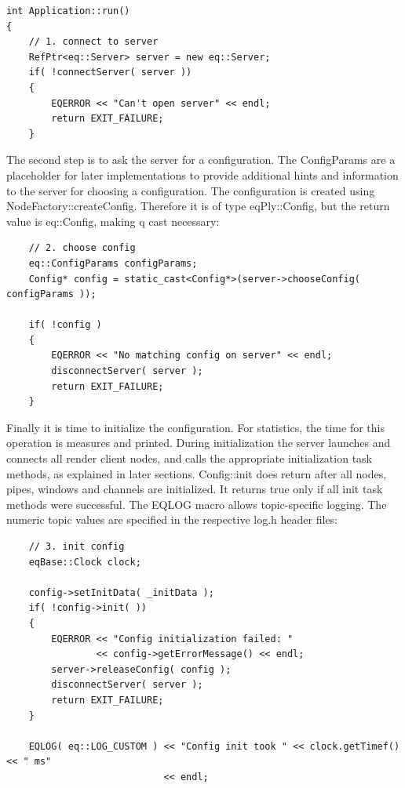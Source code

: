 \documentclass[10pt,a4]{scrartcl}
\begin{document}
{\footnotesize\begin{lstlisting}
int Application::run()
{
    // 1. connect to server
    RefPtr<eq::Server> server = new eq::Server;
    if( !connectServer( server ))
    {
        EQERROR << "Can't open server" << endl;
        return EXIT_FAILURE;
    }
\end{lstlisting}}%

The second step is to ask the server for a configuration. The
\textsf{ConfigParams} are a placeholder for later implementations to
provide additional hints and information to the server for choosing a
configuration. The configuration is created using
\textsf{NodeFactory::createConfig}. Therefore it is of type
\textsf{eqPly::Config}, but the return value is \textsf{eq::Config},
making q cast necessary:

{\footnotesize\begin{lstlisting}
    // 2. choose config
    eq::ConfigParams configParams;
    Config* config = static_cast<Config*>(server->chooseConfig( configParams ));

    if( !config )
    {
        EQERROR << "No matching config on server" << endl;
        disconnectServer( server );
        return EXIT_FAILURE;
    }
\end{lstlisting}}%

Finally it is time to initialize the configuration. For statistics, the
time for this operation is measures and printed. During initialization
the server launches and connects all render client nodes, and calls the
appropriate initialization task methods, as explained in later
sections. \textsf{Config::init} does return after all nodes, pipes,
windows and channels are initialized. It returns \textsf{true} only if
all init task methods were successful. The \textsf{EQLOG} macro allows
topic-specific logging. The numeric topic values are specified in the
respective \textsf{log.h} header files:

{\footnotesize\begin{lstlisting}
    // 3. init config
    eqBase::Clock clock;

    config->setInitData( _initData );
    if( !config->init( ))
    {
        EQERROR << "Config initialization failed: " 
                << config->getErrorMessage() << endl;
        server->releaseConfig( config );
        disconnectServer( server );
        return EXIT_FAILURE;
    }

    EQLOG( eq::LOG_CUSTOM ) << "Config init took " << clock.getTimef() << " ms"
                            << endl;
\end{lstlisting}}%
\end{document}

